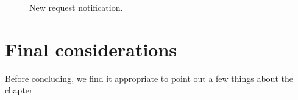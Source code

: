 \begin{figure}%
	\centering%
	\caption{New request notification.}\label{fig:notif}%
\end{figure}



\clearpage


\section{Final considerations}
Before concluding, we find it appropriate to point out a few things about the chapter. 

